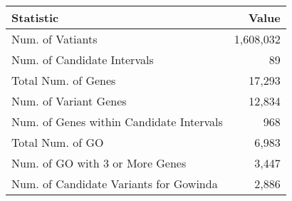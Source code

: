 \centering \begin{tabular}{l|r}
Statistic	&Value\\\hline
Num. of Vatiants	&1,608,032\\
Num. of Candidate Intervals	&89\\
Total Num. of Genes	&17,293\\
Num. of Variant Genes	&12,834\\
Num. of Genes within Candidate Intervals	&968\\
Total Num. of GO	&6,983\\
Num. of GO with 3 or More Genes	&3,447\\
Num. of Candidate Variants for Gowinda	&2,886\\
\end{tabular}
